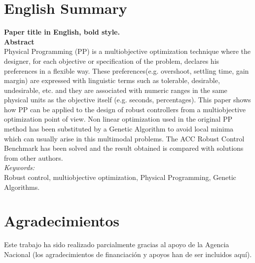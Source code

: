 \documentclass[final,5p,times,twocolumn,authoryear,10pt]{elsarticle}
\begin{document}
\section*{English Summary}

\textbf{Paper title in English, bold style.}\\

\noindent \textbf{Abstract}\\

Physical Programming (PP) is a multiobjective optimization technique where the designer, for each objective or specification of the problem, declares his preferences in a flexible way. These preferences(e.g. overshoot, settling time, gain margin) are expressed with linguistic terms such as tolerable, desirable, undesirable, etc. and they are associated with numeric ranges in the same physical units as the objective itself (e.g. seconds, percentages). This paper shows how PP can be applied to the design of robust controllers from a multiobjective optimization point of view. Non linear optimization used in the original PP method has been substituted by a Genetic Algorithm to avoid local minima which can usually arise in this multimodal problems. The ACC Robust Control Benchmark has been solved and the result obtained is compared with solutions from other authors.\\

\noindent \emph{Keywords:}\\

Robust control, multiobjective optimization, Physical Programming, Genetic Algorithms.
\section*{Agradecimientos}

Este trabajo ha sido realizado parcialmente gracias al apoyo de la Agencia Nacional (los agradecimientos de financiación y apoyos han de ser incluidos aquí).

\label{}



\end{document}
